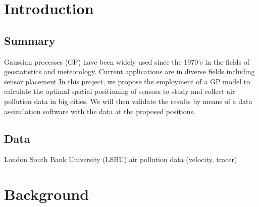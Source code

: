 \documentclass[12pt,twoside]{report}
\date{June 2019}
\begin{document}



\clearpage{\pagestyle{empty}\cleardoublepage}
\setcounter{page}{1}
\pagestyle{fancy}


\cleardoublepage

\clearpage{\pagestyle{empty}\cleardoublepage}

\tableofcontents 


\clearpage{\pagestyle{empty}\cleardoublepage}
\setcounter{page}{1}
\fancyhead[LE,RO]{\slshape \rightmark}
\fancyhead[LO,RE]{\slshape \leftmark}

\chapter{Introduction}

\section{Summary}
Gaussian processes (GP) have been widely used since the 1970’s in the fields of geostatistics and meteorology. Current applications are in diverse fields including sensor placement
In this project, we propose the employment of a GP model to calculate the optimal spatial positioning of sensors to study and collect air pollution data in big cities. We will then validate the results by means of a data assimilation software with the data at the proposed positions.

\section{Data}
London South Bank University (LSBU) air pollution data (velocity, tracer)

 
\chapter{Background}
\end{document}
